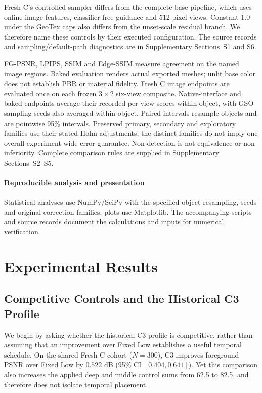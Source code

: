 \documentclass[times,twocolumn,final]{elsarticle}
\begin{document}
Fresh C's controlled sampler differs from the complete base pipeline, which uses online image features, classifier-free guidance and 512-pixel views. Constant 1.0 under the GeoTex caps also differs from the unset-scale residual branch. We therefore name these controls by their executed configuration. The source records and sampling/default-path diagnostics are in Supplementary Sections~S1 and S6.

FG-PSNR, LPIPS, SSIM and Edge-SSIM measure agreement on the named image regions. Baked evaluation renders actual exported meshes; unlit base color does not establish PBR or material fidelity. Fresh C image endpoints are evaluated once on each frozen $3\times2$ six-view composite. Native-interface and baked endpoints average their recorded per-view scores within object, with GSO sampling seeds also averaged within object. Paired intervals resample objects and are pointwise 95\% intervals. Preserved primary, secondary and exploratory families use their stated Holm adjustments; the distinct families do not imply one overall experiment-wide error guarantee. Non-detection is not equivalence or non-inferiority. Complete comparison rules are supplied in Supplementary Sections~S2--S5.

\paragraph{Reproducible analysis and presentation}
Statistical analyses use NumPy/SciPy with the specified object resampling, seeds and original correction families; plots use Matplotlib. The accompanying scripts and source records document the calculations and inputs for numerical verification.

\section{Experimental Results}
\label{sec:experiments}

\subsection{Competitive Controls and the Historical C3 Profile}
\label{subsec:largescale}

We begin by asking whether the historical C3 profile is competitive, rather than assuming that an improvement over Fixed Low establishes a useful temporal schedule. On the shared Fresh C cohort ($N=300$), C3 improves foreground PSNR over Fixed Low by $0.522$ dB (95\% CI $[0.404,0.641]$). Yet this comparison also increases the applied deep and middle control sums from 62.5 to 82.5, and therefore does not isolate temporal placement.
\end{document}
